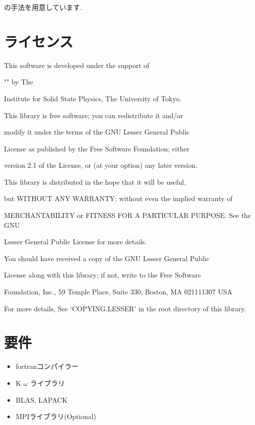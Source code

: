 \documentclass[letterpaper,10pt,dvipdfmx,openany]{sphinxmanual}
\begin{document}
の手法を用意しています.


\chapter{ライセンス}
\label{\detokenize{shiftk_copy_ja:id1}}\label{\detokenize{shiftk_copy_ja::doc}}

\begin{DUlineblock}{0em}
\item[] This software is developed under the support of
\item[] "" by The
\item[] Institute for Solid State Physics, The University of Tokyo.
\item[] 
\item[] This library is free software; you can redistribute it and/or
\item[] modify it under the terms of the GNU Lesser General Public
\item[] License as published by the Free Software Foundation; either
\item[] version 2.1 of the License, or (at your option) any later version.
\item[] This library is distributed in the hope that it will be useful,
\item[] but WITHOUT ANY WARRANTY; without even the implied warranty of
\item[] MERCHANTABILITY or FITNESS FOR A PARTICULAR PURPOSE. See the GNU
\item[] Lesser General Public License for more details.
\item[] 
\item[] You should have received a copy of the GNU Lesser General Public
\item[] License along with this library; if not, write to the Free Software
\item[] Foundation, Inc., 59 Temple Place, Suite 330, Boston, MA 02111\sphinxhyphen{}1307 USA
\item[] 
\item[] For more details, See ‘COPYING.LESSER’ in the root directory of this library.
\end{DUlineblock}


\chapter{要件}
\label{\detokenize{shiftk_env_ja:id1}}\label{\detokenize{shiftk_env_ja::doc}}\begin{itemize}
\item {} 
fortranコンパイラー

\item {} 
K \(\omega\) ライブラリ

\item {} 
BLAS, LAPACK

\item {} 
MPIライブラリ(Optional)

\end{itemize}
\end{document}
